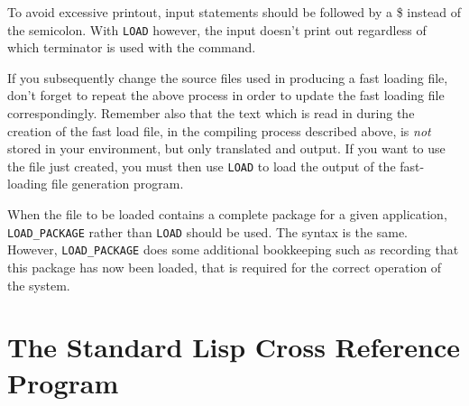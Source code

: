 To avoid excessive printout, input statements should be followed by a \$
instead of the semicolon.  With {\tt LOAD} however, the input doesn't
print out regardless of which terminator is used with the command.

If you subsequently change the source files used in producing a fast
loading file, don't forget to repeat the above process in order to update
the fast loading file correspondingly.  Remember also that the text which
is read in during the creation of the fast load file, in the compiling
process described above, is {\em not\/} stored in your {\REDUCE}
environment, but only translated and output.  If you want to use the file
just created, you must then use {\tt LOAD} to load the output of the
fast-loading file generation program.

When the file to be loaded contains a complete package for a given
application, {\tt LOAD\_PACKAGE} rather than
{\tt LOAD} should be used.  The syntax is the same.  However,
{\tt LOAD\_PACKAGE} does some additional bookkeeping such as recording that
this package has now been loaded, that is required for the correct
operation of the system.

\section{The Standard Lisp Cross Reference Program}

